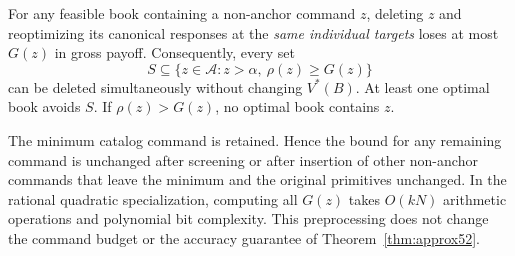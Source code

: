 \begin{theorem}\label{thm:screen53}
For any feasible book containing a non-anchor command $z$, deleting $z$ and reoptimizing its canonical responses at the \emph{same individual targets} loses at most $G(z)$ in gross payoff. Consequently, every set
\begin{equation}\label{eq:screenset53}
 S\subseteq\{z\in\mathcal A:z>\alpha,\ \rho(z)\geq G(z)\}
\end{equation}
can be deleted simultaneously without changing $V^*(B)$. At least one optimal book avoids $S$. If $\rho(z)>G(z)$, no optimal book contains $z$.

The minimum catalog command is retained. Hence the bound for any remaining command is unchanged after screening or after insertion of other non-anchor commands that leave the minimum and the original primitives unchanged. In the rational quadratic specialization, computing all $G(z)$ takes $O(kN)$ arithmetic operations and polynomial bit complexity. This preprocessing does not change the command budget or the accuracy guarantee of Theorem~\ref{thm:approx52}.
\end{theorem}
